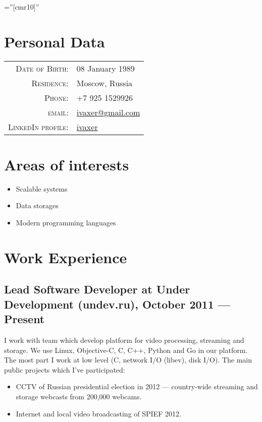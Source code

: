 \documentclass[a4paper,10pt]{article}
\begin{document}
\pagestyle{empty}

\font\fb=''[cmr10]''

\par{\bigskip\par}


\section{Personal Data}

\begin{tabular}{rl}
    \textsc{Date of Birth:} & 08 January 1989\\
    \textsc{Residence:}   & Moscow, Russia\\
    \textsc{Phone:}     & +7 925 1529926\\
    \textsc{email:}     & \href{mailto:ivaxer@gmail.com}{ivaxer@gmail.com} \\
    \textsc{LinkedIn profile:} & \href{http://www.linkedin.com/in/ivaxer}{ivaxer}
\end{tabular}


\section{Areas of interests}
\begin{itemize}
\item Scalable systems
\item Data storages
\item Modern programming languages
\end{itemize}


\section{Work Experience}
\subsection{Lead Software Developer at Under Development (undev.ru), October 2011 --- Present}
I work with team which develop platform for video processing, streaming
and storage. We use Linux, Objective-C, C, C++, Python and Go in our platform.
The most part I work at low level (C, network I/O (libev), disk I/O). The main
public projects which I've participated:
\begin{itemize}
\item CCTV of Russian presidential election in 2012 --- country-wide streaming
and storage webcasts from 200,000 webcams.
\item Internet and local video broadcasting of SPIEF 2012.
\end{itemize}
\end{document}
